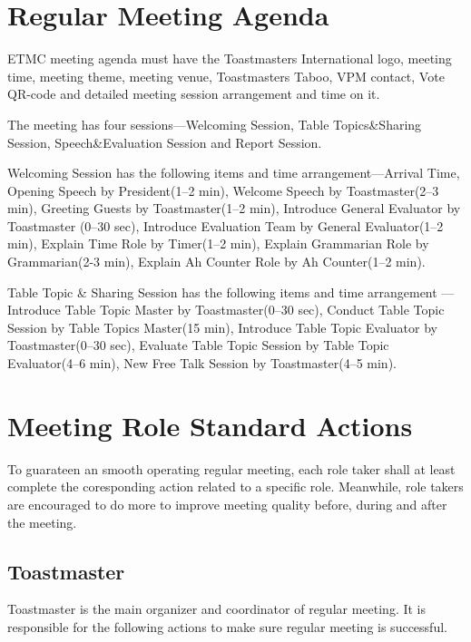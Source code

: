 \section{Regular Meeting Agenda}

ETMC meeting agenda must have the Toastmasters International logo, meeting time,
meeting theme, meeting venue, Toastmasters Taboo, VPM contact, Vote QR-code and 
detailed meeting session arrangement and time on it.

The meeting has four sessions---Welcoming Session, Table Topics\&Sharing Session,
Speech\&Evaluation Session and Report Session. 

Welcoming Session has the following items and time arrangement---Arrival Time, 
Opening Speech by President(1--2 min), Welcome Speech by Toastmaster(2--3 min),
Greeting Guests by Toastmaster(1--2 min), Introduce General Evaluator by Toastmaster
(0--30 sec), Introduce Evaluation Team by General Evaluator(1--2 min), Explain 
Time Role by Timer(1--2 min), Explain Grammarian Role by Grammarian(2-3 min),
Explain Ah Counter Role by Ah Counter(1--2 min).

Table Topic \& Sharing Session has the following items and time arrangement
---Introduce Table Topic Master by Toastmaster(0--30 sec),  Conduct Table Topic Session
by Table Topics Master(15 min), Introduce Table Topic Evaluator by Toastmaster(0--30 sec),
Evaluate Table Topic Session by Table Topic Evaluator(4--6 min), New Free Talk Session
by Toastmaster(4--5 min).








\section{Meeting Role Standard Actions}

To guarateen an smooth operating regular meeting, each role taker shall 
at least complete the coresponding action related to a specific role. Meanwhile, 
role takers are encouraged to do more to improve meeting quality before, during 
and after the meeting.

\subsection{Toastmaster}

Toastmaster is the main organizer and coordinator of regular meeting. 
It is responsible for the following actions to make sure regular meeting 
is successful.

